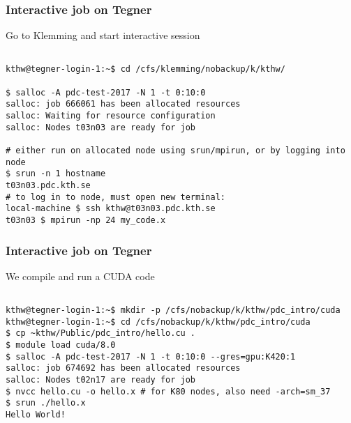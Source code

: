 \begin{frame}[fragile]
  \frametitle{Interactive job on Tegner}
  \begin{alertblock}{Go to Klemming and start interactive session}
    \verbatimfont{\footnotesize}
    \begin{verbatim}

kthw@tegner-login-1:~$ cd /cfs/klemming/nobackup/k/kthw/

$ salloc -A pdc-test-2017 -N 1 -t 0:10:0
salloc: job 666061 has been allocated resources
salloc: Waiting for resource configuration
salloc: Nodes t03n03 are ready for job

# either run on allocated node using srun/mpirun, or by logging into node
$ srun -n 1 hostname
t03n03.pdc.kth.se
# to log in to node, must open new terminal:
local-machine $ ssh kthw@t03n03.pdc.kth.se
t03n03 $ mpirun -np 24 my_code.x

 \end{verbatim}
\end{alertblock}



\end{frame}



\begin{frame}[fragile]
  \frametitle{Interactive job on Tegner}
  \begin{alertblock}{We compile and run a CUDA code}
    \verbatimfont{\footnotesize}
    \begin{verbatim}

kthw@tegner-login-1:~$ mkdir -p /cfs/nobackup/k/kthw/pdc_intro/cuda
kthw@tegner-login-1:~$ cd /cfs/nobackup/k/kthw/pdc_intro/cuda
$ cp ~kthw/Public/pdc_intro/hello.cu .
$ module load cuda/8.0
$ salloc -A pdc-test-2017 -N 1 -t 0:10:0 --gres=gpu:K420:1
salloc: job 674692 has been allocated resources
salloc: Nodes t02n17 are ready for job
$ nvcc hello.cu -o hello.x # for K80 nodes, also need -arch=sm_37
$ srun ./hello.x
Hello World!

 \end{verbatim}
\end{alertblock}



\end{frame}



